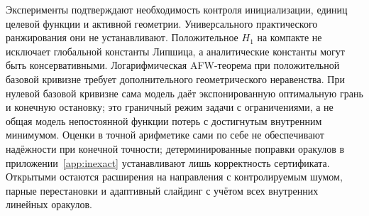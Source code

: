 \documentclass[a4paper,11pt]{article}
\begin{document}
Эксперименты подтверждают необходимость контроля инициализации,
единиц целевой функции и активной геометрии. Универсального практического
ранжирования они не устанавливают. Положительное $H_1$ на компакте не
исключает глобальной константы Липшица, а аналитические константы могут
быть консервативными. Логарифмическая AFW-теорема при положительной
базовой кривизне требует дополнительного геометрического неравенства.
При нулевой базовой кривизне сама модель даёт экспонированную
оптимальную грань и конечную остановку; это граничный режим задачи
с ограничениями, а не общая модель непостоянной функции потерь с
достигнутым внутренним минимумом. Оценки в точной арифметике сами по
себе не обеспечивают надёжности при конечной точности; детерминированные
поправки оракулов в приложении~\ref{app:inexact} устанавливают лишь
корректность сертификата. Открытыми остаются расширения на направления
с контролируемым шумом, парные перестановки и адаптивный слайдинг с
учётом всех внутренних линейных оракулов.
\begin{otherlanguage}{english}

\end{otherlanguage}
\appendix

\end{document}
